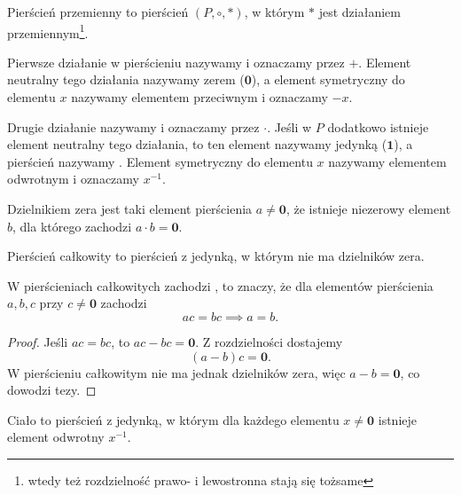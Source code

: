 \documentclass[11pt]{scrartcl}
\begin{document}
    \begin{definition}
        Pierścień przemienny to pierścień $(P, \circ, *)$, w którym $*$ jest działaniem przemiennym\footnote{wtedy też rozdzielność prawo- i lewostronna stają się tożsame}.
    \end{definition}

    Pierwsze działanie w pierścieniu nazywamy  i oznaczamy przez $+$. Element neutralny tego działania nazywamy zerem ($\mathbf{0}$), a element symetryczny do elementu $x$ nazywamy elementem przeciwnym i oznaczamy $-x$.

    Drugie działanie nazywamy  i oznaczamy przez $\cdot$. Jeśli w $P$ dodatkowo istnieje element neutralny tego działania, to ten element nazywamy jedynką ($\mathbf{1}$), a pierścień nazywamy . Element symetryczny do elementu $x$ nazywamy elementem odwrotnym i oznaczamy $x^{-1}$.

    \begin{definition}
        Dzielnikiem zera jest taki element pierścienia $a \neq \mathbf{0}$, że istnieje niezerowy element $b$, dla którego zachodzi $a \cdot b = \mathbf{0}$.
    \end{definition}

    \begin{definition}
        Pierścień całkowity to pierścień z jedynką, w którym nie ma dzielników zera.
    \end{definition}

    \begin{lemma}
        \label{l:cancellation_property}
        W pierścieniach całkowitych zachodzi , to znaczy, że dla elementów pierścienia $a, b, c$ przy $c \neq \mathbf{0}$ zachodzi
        $$ ac = bc \implies a = b. $$
    \end{lemma}
    \begin{proof}
        Jeśli $ac = bc$, to $ac - bc = \mathbf{0}$. Z rozdzielności dostajemy
        $$ (a - b)c = \mathbf{0}. $$
        W pierścieniu całkowitym nie ma jednak dzielników zera, więc $a - b = \mathbf{0}$, co dowodzi tezy.
    \end{proof}

    \begin{definition}
        Ciało to pierścień z jedynką, w którym dla każdego elementu $x \neq \mathbf{0}$ istnieje element odwrotny $x^{-1}$.
    \end{definition}
\end{document}
